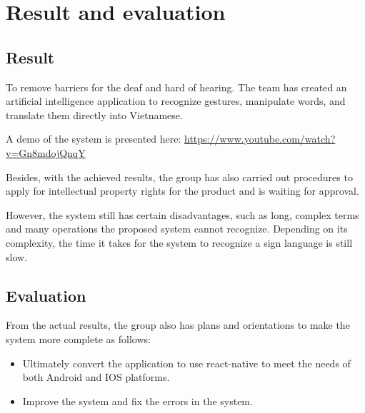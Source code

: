 \chapter{Result and evaluation}

\section{Result}

To remove barriers for the deaf and hard of hearing. The team has created an artificial intelligence application to recognize gestures, manipulate words, and translate them directly into Vietnamese.

A demo of the system is presented here: \url{https://www.youtube.com/watch?v=Gn8mdojQnqY}


Besides, with the achieved results, the group has also carried out procedures to apply for intellectual property rights for the product and is waiting for approval.


However, the system still has certain disadvantages, such as long, complex terms and many operations the proposed system cannot recognize. Depending on its complexity, the time it takes for the system to recognize a sign language is still slow.

\section{Evaluation}

From the actual results, the group also has plans and orientations to make the system more complete as follows:

\begin{itemize}
  \item Ultimately convert the application to use react-native to meet the needs of both Android and IOS platforms.
  \item Improve the system and fix the errors in the system.
\end{itemize}










